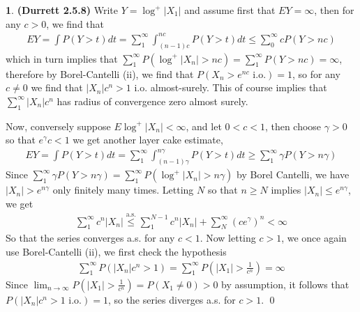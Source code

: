 \documentclass{article}
\theoremstyle{definition}
\newtheorem{pb}{}
\newcommand{\abs}[1]{\left\vert#1\right\vert}
\begin{document}
    \begin{pb}\textbf{(Durrett 2.5.8)}
        Write \(Y = \log^+\abs{X_1}\) and assume first that \(EY = \infty\), then for any \(c > 0\), we find that
        \begin{align*}
            EY = \int P(Y>t)dt = \sum_1^\infty \int_{(n-1)c}^{nc} P(Y>t)dt \leq \sum_0^\infty cP(Y>nc)
        \end{align*}
        which in turn implies that \(\sum_1^\infty P(\log^+\abs{X_n} > nc) =  \sum_1^\infty P(Y > nc) = \infty\), therefore by Borel-Cantelli (ii), we find that \(P(X_n > e^{nc} \text{ i.o.}) = 1\), so for any \(c \neq 0\) we find that \(\abs{X_n}c^n > 1\) i.o. almost-surely. This of course implies that \(\sum_1^\infty \abs{X_n}c^n\) has radius of convergence zero almost surely.

        Now, conversely suppose \(E\log^+ \abs{X_n} < \infty\), and let \(0 < c < 1\), then choose \(\gamma > 0\) so that \(e^{\gamma}c < 1\) we get another layer cake estimate,
        \begin{align*}
            EY = \int P(Y>t)dt = \sum_1^\infty \int_{(n-1)\gamma}^{n\gamma} P(Y>t)dt \geq \sum_1^\infty \gamma P(Y>n\gamma)
        \end{align*}
        Since \(\sum_1^\infty \gamma P(Y>n\gamma) = \sum_1^\infty P(\log^+ \abs{X_n} > n\gamma)\) by Borel Cantelli, we have \(\abs{X_n} > e^{n\gamma}\) only finitely many times. Letting \(N\) so that \(n \geq N\) implies \(\abs{X_n} \leq e^{n\gamma}\), we get
        \begin{align*}
            \sum_1^\infty c^n\abs{X_n} \overset{\text{a.s.}}{\leq} \sum_1^{N-1}c^n\abs{X_n} + \sum_N^\infty (ce^{\gamma})^n < \infty
        \end{align*}
        So that the series converges a.s. for any \(c < 1\). Now letting \(c > 1\), we once again use Borel-Cantelli (ii), we first check the hypothesis
        \begin{align*}
            \sum_1^\infty P(\abs{X_n}c^n > 1) = \sum_1^\infty P(\abs{X_1} > \frac{1}{c^n}) = \infty
        \end{align*}
        Since \(\lim_{n\to\infty}P(\abs{X_1} > \frac{1}{c^n}) = P(X_1 \neq 0) > 0\) by assumption, it follows that \(P(\abs{X_n}c^n > 1 \text{ i.o.}) = 1\), so the series diverges a.s. for \(c > 1\). \qed
    \end{pb}
\end{document}
